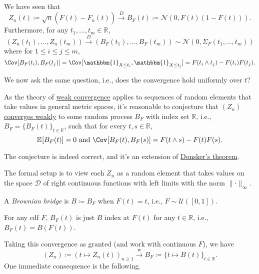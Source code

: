 \begin{prev}
	We have seen that
	\[
		Z_n(t) \coloneqq \sqrt{n} (F(t) - \hat{F} _n(t))
		\overset{D}{\to} B_F(t) \coloneqq \mathcal{N} (0, F(t) (1 - F(t))).
	\]
	Furthermore, for any \(t_1, \dots , t_m \in \mathbb{R} \),
	\[
		(Z_n(t_1), \dots , Z_n(t_m)) \overset{D}{\to} (B_F(t_1), \dots , B_F(t_m)) \sim \mathcal{N} (0, \Sigma _F(t_1, \dots , t_m))
	\]
	where for \(1 \leq i \leq j \leq m\),
	\[
		\Cov_{}[B_F(t_i), B_F(t_j)]
		= \Cov_{}[\mathbbm{1}_{X \leq t_i} , \mathbbm{1}_{X \leq t_j} ]
		= F(t_i \land t_j) - F(t_i) F(t_j).
	\]
\end{prev}

We now ask the same question, i.e., does the convergence hold uniformly over \(t\)?

\begin{intuition}
	As the theory of \hyperref[def:converge-weakly]{weak convergence} applies to sequences of random elements that take values in general metric spaces, it's reasonable to conjecture that \((Z_n)\) \hyperref[def:converge-weakly]{converges weakly} to some random process \(B_F\) with index set \(\mathbb{R} \), i.e., \(B_F = \{ B_F(t) \} _{t\in \mathbb{R} }\), such that for every \(t, s\in \mathbb{R} \),
	\[
		\mathbb{E}_{}[B_F(t)] = 0 \text{ and } \Cov_{}[B_F(t), B_F(s)] = F(t \land s) - F(t) F(s).
	\]
\end{intuition}

The conjecture is indeed correct, and it's an extension of \href{https://en.wikipedia.org/wiki/Donsker%27s_theorem}{Donsker's theorem}.

\begin{note}
	The formal setup is to view each \(Z_n\) as a random element that takes values on the space \(\mathcal{D} \) of right continuous functions with left limits with the norm \(\lVert \cdot \rVert _\infty \).
\end{note}

\begin{eg}
	A \emph{Brownian bridge} is \(B \coloneqq B_F\) when \(F(t) = t\), i.e., \(F \sim \mathcal{U} ([0, 1])\).
\end{eg}

\begin{note}
	For any cdf \(F\), \(B_F(t)\) is just \(B\) index at \(F(t)\) for any \(t \in \mathbb{R} \), i.e., \(B_F(t) = B(F(t))\).
\end{note}

Taking this convergence as granted (and work with continuous \(F\)), we have
\[
	(Z_n) \coloneqq (t \mapsto Z_n(t))_{n \geq 1} \overset{\text{w} }{\to} B_F \coloneqq \{ t \mapsto B(t) \}_{t\in \mathbb{R} }.
\]
One immediate consequence is the following.


